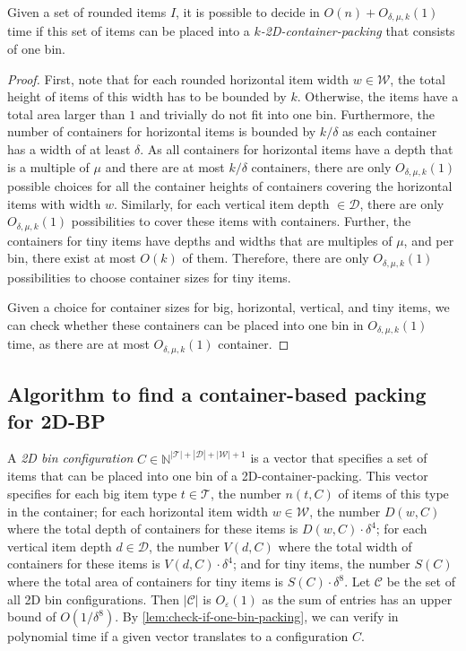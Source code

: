 \documentclass[a4paper,UKenglish,cleveref, autoref, thm-restate]{lipics-v2021}
\newcommand{\eps}{\varepsilon}
\newcommand{\bigy}{big\xspace}
\newcommand{\tin}{tiny\xspace}
\begin{document}
\begin{lemma}
\label{lem:check-if-one-bin-packing}
    Given a set of rounded items $I$, it is possible to decide in $O(n)+ O_{\delta,\mu,k}(1)$ time if this set of items can be placed into a \emph{$k$-2D-container-packing} that consists of one bin. 
\end{lemma}
\begin{proof}
First, note that for each rounded horizontal item width $w \in \mathcal{W}$, the total height of items of this width has to be bounded by $k$. 
Otherwise, the items have a total area larger than $1$ and trivially do not fit into one bin.
Furthermore, the number of containers for horizontal items is bounded by $k/\delta$ as each container has a width of at least $\delta$.
As all containers for horizontal items have a depth that is a multiple of $\mu$ and there are at most $k/\delta$ containers, there are only $O_{\delta,\mu,k}(1)$ possible choices for all the container heights of containers covering the horizontal items with width $w$.
Similarly, for each vertical item depth $\in \mathcal{D}$, there are only $O_{\delta,\mu,k}(1)$ possibilities to cover these items with containers.
Further, the containers for \tin items have depths and widths that are multiples of $\mu$, and per bin, there exist at most $O(k)$ of them.
Therefore, there are only $O_{\delta,\mu,k}(1)$ possibilities to choose container sizes for \tin items.

Given a choice for container sizes for \bigy, horizontal, vertical, and \tin items, we can check whether these containers can be placed into one bin in $O_{\delta,\mu,k}(1)$ time, as there are at most $O_{\delta,\mu,k}(1)$ container.
\end{proof}

\subsection{Algorithm to find a container-based packing for 2D-BP}

A {\em 2D bin configuration} $C \in \mathbb{N}^{|\mathcal{T}|+|\mathcal{D}|+|\mathcal{W}|+1}$ is a vector that specifies a set of items that can be placed into one bin of a 2D-container-packing. 
This vector specifies for each \bigy item type $t \in \mathcal{T}$, the number $n(t,C)$ of items of this type in the container; for each horizontal item width $w \in \mathcal{W}$,  the number $D(w,C)$ where the total depth of containers for these items is $D(w,C) \cdot \delta^4$; for each vertical item depth $d \in \mathcal{D}$, the number $V(d,C)$ where the total width of containers for these items is $V(d,C)\cdot \delta^4$; and for \tin items, the number $S(C)$  where the total area of containers for \tin items is $S(C)\cdot \delta^8$.
Let $\mathcal{C}$ be the set of all 2D bin configurations.
Then $|\mathcal{C}|$ is $O_{\eps}(1)$ as the sum of entries has an upper bound of $O(1/\delta^8)$. 
By \cref{lem:check-if-one-bin-packing}, we can verify in polynomial time if a given vector translates to a configuration $C$.
\end{document}

